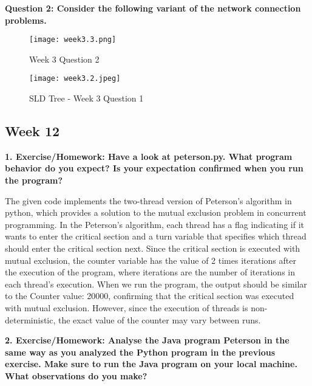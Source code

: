 \documentclass{article}
\theoremstyle{theorem}
\theoremstyle{definition}
\theoremstyle{remark}
\begin{document}
\pagebreak

\textbf{Question 2: Consider the following variant of the network connection problems.}
\begin{figure}[h!]
    \centering
    \texttt{[image: week3.3.png]}
    \caption{Week 3 Question 2}
    \label{fig:Week 3 Question 2}
\end{figure}

\begin{figure}[h!]
    \centering
    \texttt{[image: week3.2.jpeg]}
    \caption{SLD Tree - Week 3 Question 1}
    \label{fig:SLD Tree - Week 3 Question 2}
\end{figure}

\pagebreak

\subsection{Week 12}
\textbf{1. Exercise/Homework: Have a look at peterson.py. What program behavior do you expect? Is your expectation confirmed when you run the program?}

\medskip\noindent
The given code implements the two-thread version of Peterson's algorithm in python, which provides a solution to the mutual exclusion problem in concurrent programming. In the Peterson's algorithm, each thread has a flag indicating if it wants to enter the critical section and a turn variable that specifies which thread should enter the critical section next.
Since the critical section is executed with mutual exclusion, the counter variable has the value of 2 times iterations after the execution of the program, where iterations are the number of iterations in each thread's execution. When we run the program, the output should be similar to the Counter value: 20000, confirming that the critical section was executed with mutual exclusion. However, since the execution of threads is non-deterministic, the exact value of the counter may vary between runs.

\medskip\noindent
\textbf{2. Exercise/Homework: Analyse the Java program Peterson in the same way as you analyzed the Python program in the previous exercise. Make sure to run the Java program on your local machine. What observations do you make?}
\end{document}
